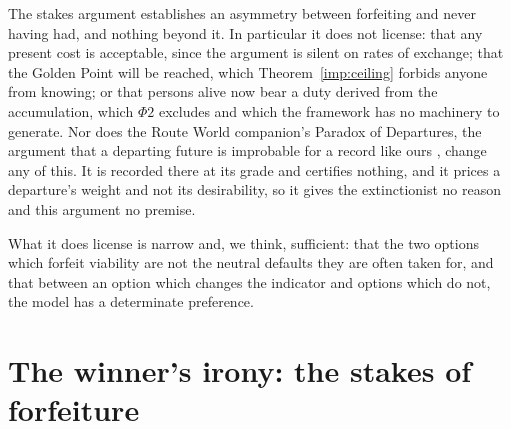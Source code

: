 \begin{remark}\label{hr:rem:stakeslimit}
The stakes argument establishes an asymmetry between forfeiting and
never having had, and nothing beyond it. In particular it does not
license: that any present cost is acceptable, since the argument is
silent on rates of exchange; that the Golden Point will be reached,
which Theorem~\ref{imp:ceiling} forbids anyone from knowing; or that
persons alive now bear a duty derived from the accumulation, which
$\Phi2$ excludes and which the framework has no machinery to generate.
Nor does the Route World companion's Paradox of Departures, the
argument that a departing future is improbable for a record like ours
\cite{GoldenRouteWorld}, change any of this. It is recorded there at its
grade and certifies nothing, and it prices a departure's weight and not
its desirability, so it gives the extinctionist no reason and this
argument no premise.

What it does license is narrow and, we think, sufficient: that the two
options which forfeit viability are not the neutral defaults they are
often taken for, and that between an option which changes the indicator
and options which do not, the model has a determinate preference.
\end{remark}


\section{The winner's irony: the stakes of forfeiture}\label{sec:irony}


